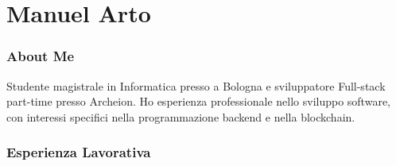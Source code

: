 \documentclass{tccv}
\begin{document}
\part{Manuel Arto}

\section{About Me}

Studente magistrale in Informatica presso a Bologna e sviluppatore Full-stack part-time presso Archeion.\newline
Ho esperienza professionale nello sviluppo software, con interessi specifici nella programmazione backend e nella blockchain.

\section{Esperienza Lavorativa}
\end{document}
